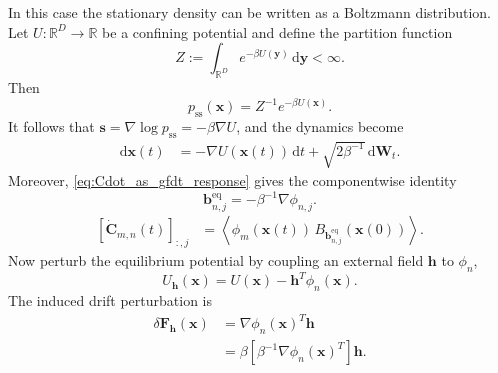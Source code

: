 \documentclass[11pt,twoside,fleqn]{article}
\renewcommand{\d}{\mathrm{d}}
\begin{document}
In this case the stationary density can be written as a Boltzmann distribution.
Let \(U:\mathbb{R}^D\to\mathbb{R}\) be a confining potential and define the
partition function
\begin{equation}
    Z
    :=
    \int_{\mathbb{R}^D}
        e^{-\beta U(\bm{y})}
    \,\d\bm{y}
    <
    \infty .
    \label{eq:equilibrium_partition_function}
\end{equation}
Then
\begin{equation}
    p_{\mathrm{ss}}(\bm{x})
    =
    Z^{-1}e^{-\beta U(\bm{x})}.
    \label{eq:equilibrium_boltzmann_density}
\end{equation}
It follows that \(\bm{s}=\nabla\log p_{\mathrm{ss}}=-\beta\nabla U\), and the
dynamics become
\begin{equation}
\begin{aligned}
    \d\bm{x}(t)
    &=
    -\nabla U(\bm{x}(t))\,\d t
    +
    \sqrt{2\beta^{-1}}\,\d\bm{W}_t .
\end{aligned}
    \label{eq:equilibrium_overdamped_langevin}
\end{equation}
Moreover, \eqref{eq:Cdot_as_gfdt_response} gives the componentwise identity
\begin{equation}
    \bm{b}^{\mathrm{eq}}_{n,j}
    =
    -
    \beta^{-1}\nabla\phi_{n,j}.
    \label{eq:equilibrium_b_n_j}
\end{equation}
\begin{equation}
\begin{aligned}
    \left[\dot{\bm{C}}_{m,n}(t)\right]_{:,j}
    &=
    \left\langle
        \phi_m(\bm{x}(t))\,
        B_{\bm{b}^{\mathrm{eq}}_{n,j}}(\bm{x}(0))
    \right\rangle .
\end{aligned}
    \label{eq:equilibrium_cdot_b}
\end{equation}
Now perturb the equilibrium potential by coupling an external field
\(\bm{h}\) to \(\phi_n\),
\begin{equation}
    U_{\bm{h}}(\bm{x})
    =
    U(\bm{x})
    -
    \bm{h}^T\phi_n(\bm{x}) .
    \label{eq:equilibrium_field_coupling}
\end{equation}
The induced drift perturbation is
\begin{equation}
\begin{aligned}
    \delta\bm{F}_{\bm{h}}(\bm{x})
    &=
    \nabla\phi_n(\bm{x})^T\bm{h}
    \\
    &=
    \beta
    \left[
        \beta^{-1}\nabla\phi_n(\bm{x})^T
    \right]\bm{h}.
\end{aligned}
    \label{eq:equilibrium_field_drift_perturbation}
\end{equation}
\end{document}
